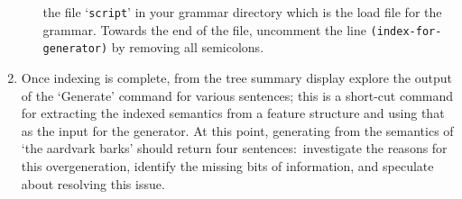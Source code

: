\documentclass[10pt]{article}
\begin{document}
\begin{enumerate}
\begin{itemize}
                the file `{\tt script}' in your grammar directory which
                is the load file for the grammar.  Towards the
                end of the file, uncomment the line 
                {\tt (index-for-generator)} by removing all semicolons.
        \end{itemize}
        \item []
        Once indexing is complete, from the tree summary display
        explore the output of the `Generate' 
        command for various sentences; this is a short-cut command for
        extracting the indexed semantics from a feature structure and
        using that as the input for the generator.
        At this point, generating from the semantics of `the aardvark
        barks' should return four sentences:\ investigate the reasons
        for this overgeneration, identify the missing bits of
        information, and speculate about resolving this issue.
\end{enumerate}
\end{document}
